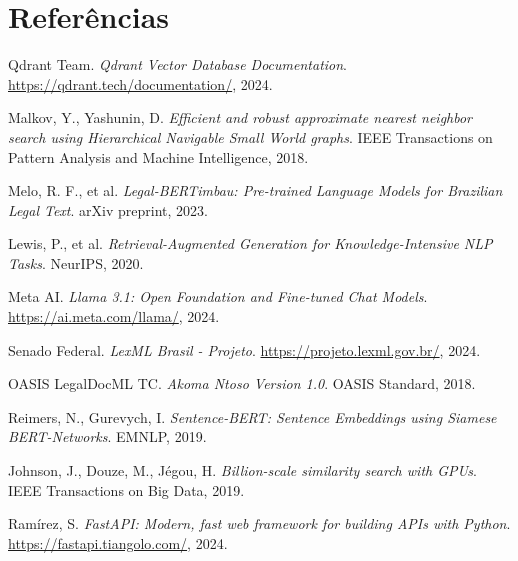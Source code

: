 \documentclass[12pt,a4paper]{article}
\begin{document}
\section*{Referências}

\begin{thebibliography}{99}

Qdrant Team. \textit{Qdrant Vector Database Documentation}.
\url{https://qdrant.tech/documentation/}, 2024.

Malkov, Y., Yashunin, D.
\textit{Efficient and robust approximate nearest neighbor search using Hierarchical Navigable Small World graphs}.
IEEE Transactions on Pattern Analysis and Machine Intelligence, 2018.

Melo, R. F., et al.
\textit{Legal-BERTimbau: Pre-trained Language Models for Brazilian Legal Text}.
arXiv preprint, 2023.

Lewis, P., et al.
\textit{Retrieval-Augmented Generation for Knowledge-Intensive NLP Tasks}.
NeurIPS, 2020.

Meta AI.
\textit{Llama 3.1: Open Foundation and Fine-tuned Chat Models}.
\url{https://ai.meta.com/llama/}, 2024.

Senado Federal.
\textit{LexML Brasil - Projeto}.
\url{https://projeto.lexml.gov.br/}, 2024.

OASIS LegalDocML TC.
\textit{Akoma Ntoso Version 1.0}.
OASIS Standard, 2018.

Reimers, N., Gurevych, I.
\textit{Sentence-BERT: Sentence Embeddings using Siamese BERT-Networks}.
EMNLP, 2019.

Johnson, J., Douze, M., Jégou, H.
\textit{Billion-scale similarity search with GPUs}.
IEEE Transactions on Big Data, 2019.

Ramírez, S.
\textit{FastAPI: Modern, fast web framework for building APIs with Python}.
\url{https://fastapi.tiangolo.com/}, 2024.

\end{thebibliography}

\end{document}

